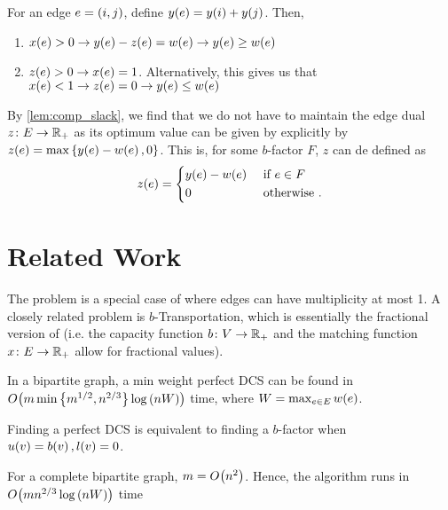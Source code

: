 
\begin{lemma}
    For an edge $e = \lrp{i, j}$, define $\f[y]{e} = \f[y]{i} + \f[y]{j}$. Then, 
    \begin{enumerate}
        \item $\f[x]{e} > 0 \rightarrow \f[y]{e} - \f[z]{e} = \f[w]{e} \rightarrow \f[y]{e} \geq \f[w]{e}$
        \item $\f[z]{e} > 0 \rightarrow \f[x]{e} = 1$. Alternatively, this gives us that $\f[x]{e} < 1 \rightarrow \f[z]{e} = 0 \rightarrow \f[y]{e} \leq \f[w]{e}$
    \end{enumerate} 
    \label{lem:comp_slack}
\end{lemma}

By \cref{lem:comp_slack}, we find that we do not have to maintain the edge dual $z \colon E \to \R_+$ as its 
optimum value can be given by explicitly by $\f[z]{e} = \max \lrc{\f[y]{e} - \f[w]{e}, 0}$. This is, for some $b$-factor $F$, 
$z$ can de defined as
\begin{equation*}
    \f[z]{e} = 
    \begin{dcases}
        \f[y]{e} - \f[w]{e} &\text{ if }  e \in F\\
        0 &\text{ otherwise }  .
    \end{dcases}
\end{equation*}


\section{Related Work}

The \minbfactor{} problem is a special case of \minpbmatch{} where edges can have multiplicity at most 1. A closely related problem 
is $b$-\textsf{Transportation}, which is essentially the fractional version of \minpbmatch{} 
(i.e.\! the capacity function $b \colon V \to \R_+$ and the matching function $x \colon E \to \R_+$ allow for fractional values).

\begin{desclist}
    \item In a bipartite graph, a min weight perfect DCS can be found in $\bigO{m \min \lrc{m^{1/2}, n^{2/3}} \log \lrp{nW}}$ time, where $W = \max_{e \in E} \f[w]{e}$. 
    \item Finding a perfect DCS is equivalent to finding a $b$-factor when $\f[u]{v} = \f[b]{v}, \f[l]{v} = 0$.
    \item For a complete bipartite graph, $m = \bigO{n^2}$. Hence, the algorithm runs in $\bigO{mn^{2/3}\log \lrp{nW}}$ time 
\end{desclist}

